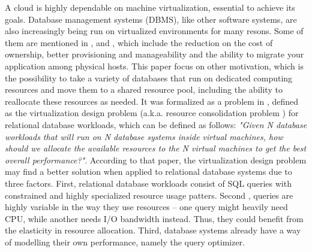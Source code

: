 A cloud is highly dependable on machine virtualization, essential to achieve its goals. Database management systems (DBMS), like other software systems, are also increasingly being run on virtualized environments for many resons. Some of them are mentioned in \cite{4498282}, \cite{4401021} and \cite{Soror:2008:AVM:1376616.1376711}, which include the reduction on the cost of ownership, better provisioning and manageability and the ability to migrate your application among physical hosts. This paper focus on other motivation, which is the possibility to take a variety of databases that run on dedicated computing resources and move them to a shared resource pool, including the ability to reallocate these resources as needed. It was formalized as a problem in \cite{4401021}, defined as the virtualization design problem (a.k.a. resource consolidation problem ) for relational database workloads, which can be defined as follows: \textit{"Given N database workloads that will run on N database systems inside virtual machines, how should we allocate the available resources to the N virtual machines to get the best overall performance?"}. According to that paper, the virtualization design problem may find a better solution when applied to relational database systems due to three factors. First, relational database workloads consist of SQL queries with constrained and highly specialized resource usage patters. Second , queries are highly variable in the way they use resources -- one query might heavily need CPU, while another needs I/O bandwidth instead. Thus, they could benefit from the elasticity in resource allocation. Third, database systems already have a way of modelling their own performance, namely the query optimizer.

